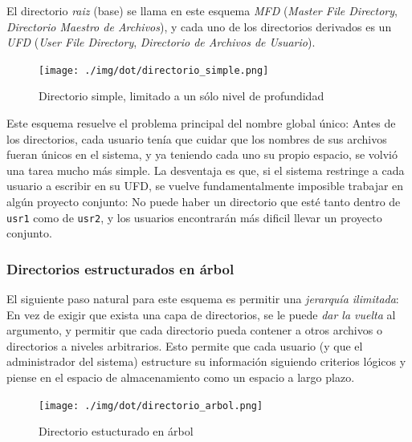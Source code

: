 \documentclass[11pt,fleqn]{book} %
\begin{document}
El directorio \emph{raiz} (base) se llama en este esquema \emph{MFD} (\emph{Master File Directory}, \emph{Directorio Maestro de Archivos}), y cada uno de los
directorios derivados es un \emph{UFD} (\emph{User File Directory}, \emph{Directorio de Archivos de Usuario}).

\begin{figure}[htb]
\centering
\texttt{[image: ./img/dot/directorio\_simple.png]}
\caption{\label{DIR_directorio_simple}Directorio simple, limitado a un sólo nivel de profundidad}
\end{figure}

Este esquema resuelve el problema principal del nombre global único:
Antes de los directorios, cada usuario tenía que cuidar que los
nombres de sus archivos fueran únicos en el sistema, y ya teniendo
cada uno su propio espacio, se volvió una tarea mucho más simple. La
desventaja es que, si el sistema restringe a cada usuario a escribir
en su UFD, se vuelve fundamentalmente imposible trabajar en algún
proyecto conjunto: No puede haber un directorio que esté tanto dentro
de \texttt{usr1} como de \texttt{usr2}, y los usuarios encontrarán más dificil
llevar un proyecto conjunto.
\subsubsection{Directorios estructurados en árbol}
\label{sec-6-3-1-4}


El siguiente paso natural para este esquema es permitir una \emph{jerarquía ilimitada}: En vez de exigir que exista una capa de directorios, se le
puede \emph{dar la vuelta} al argumento, y permitir que cada directorio
pueda contener a otros archivos o directorios a niveles
arbitrarios. Esto permite que cada usuario (y que el administrador del
sistema) estructure su información siguiendo criterios lógicos y
piense en el espacio de almacenamiento como un espacio a largo plazo.

\begin{figure}[htb]
\centering
\texttt{[image: ./img/dot/directorio\_arbol.png]}
\caption{\label{DIR_directorio_arbol}Directorio estucturado en árbol}
\end{figure}
\end{document}
